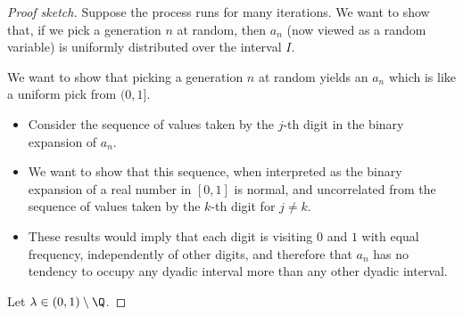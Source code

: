 \begin{enumerate}[label=(5.\arabic*)]
  \begin{proof}[Proof sketch]
    Suppose the process runs for many iterations. We want to show that, if we pick a generation $n$ at random,
    then $a_n$ (now viewed as a random variable) is uniformly distributed over the interval $I$.

    We want to show that picking a generation $n$ at random yields an $a_n$ which is like a uniform pick
    from $(0, 1]$.

    \begin{itemize}
    \item Consider the sequence of values taken by the $j$-th digit in the binary expansion of $a_n$.
    \item We want to show that this sequence, when interpreted as the binary expansion of a real number in
      $[0, 1]$ is normal, and uncorrelated from the sequence of values taken by the $k$-th digit for $j \neq k$.
    \item These results would imply that each digit is visiting $0$ and $1$ with equal frequency, independently of
      other digits, and therefore that $a_n$ has no tendency to occupy any dyadic interval more than any other
      dyadic interval.
    \end{itemize}

    Let $\lambda \in (0, 1) \setminus \Q$.


  \end{proof}
\end{enumerate}